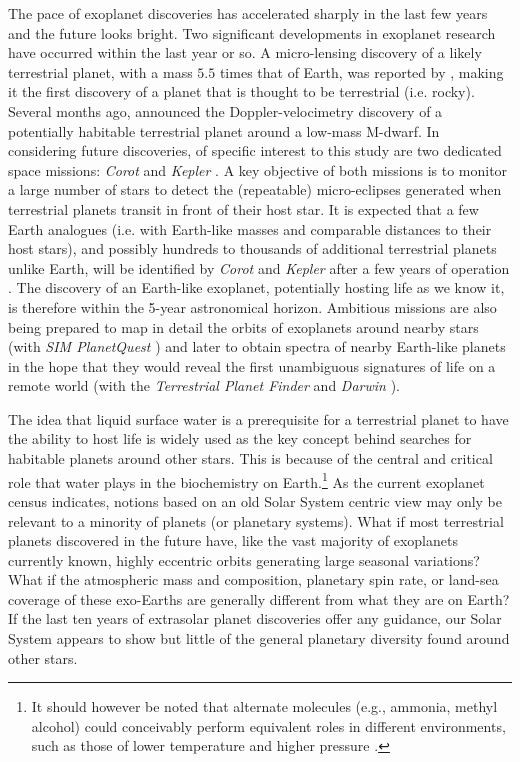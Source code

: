 The pace of exoplanet discoveries has accelerated sharply in the last
few years and the future looks bright. Two significant developments in
exoplanet research have occurred within the last year or so. A
micro-lensing discovery of a likely terrestrial planet, with a mass
$5.5$ times that of Earth, was reported by \citet{beaulieu_et_al2006},
making it the first discovery of a planet that is thought to be
terrestrial (i.e. rocky). Several months ago, \citet{udry_et_al2007}
announced the Doppler-velocimetry discovery of a potentially habitable
terrestrial planet around a low-mass M-dwarf.  In considering future
discoveries, of specific interest to this study are two dedicated
space missions: {\it Corot} and {\it Kepler}
\citep{baglin2003,borucki_et_al2003,borucki_et_al2007}. A key
objective of both missions is to monitor a large number of stars to
detect the (repeatable) micro-eclipses generated when terrestrial
planets transit in front of their host star.  It is expected that a
few Earth analogues (i.e. with Earth-like masses and comparable
distances to their host stars), and possibly hundreds to thousands of
additional terrestrial planets unlike Earth, will be identified by
{\it Corot} and {\it Kepler} after a few years of operation
\citep{borucki_et_al2007, borucki_et_al2003, basri_et_al2005}. The
discovery of an Earth-like exoplanet, potentially hosting life as we
know it, is therefore within the 5-year astronomical
horizon. Ambitious missions are also being prepared to map in detail
the orbits of exoplanets around nearby stars (with {\it SIM
PlanetQuest} \citep{unwin_et_al2007}) and later to obtain spectra of
nearby Earth-like planets in the hope that they would reveal the first
unambiguous signatures of life on a remote world (with the {\it
Terrestrial Planet Finder} and {\it Darwin}
\citealt{leger+herbst2007}).

The idea that liquid surface water is a prerequisite for a terrestrial
planet to have the ability to host life is widely used as the key
concept behind searches for habitable planets around other stars.
This is because of the central and critical role that water plays in
the biochemistry on Earth.\footnote{It should however be noted that
alternate molecules (e.g., ammonia, methyl alcohol) could conceivably
perform equivalent roles in different environments, such as those of
lower temperature and higher pressure
\citep{haldene1954,firsoff1963,goldsmith+owen2002}.}  As the current
exoplanet census indicates, notions based on an old Solar System
centric view may only be relevant to a minority of planets (or
planetary systems). What if most terrestrial planets discovered in the
future have, like the vast majority of exoplanets currently known,
highly eccentric orbits generating large seasonal variations?  What if
the atmospheric mass and composition, planetary spin rate, or land-sea
coverage of these exo-Earths are generally different from what they
are on Earth?  If the last ten years of extrasolar planet discoveries
offer any guidance, our Solar System appears to show but little of the
general planetary diversity found around other stars.

